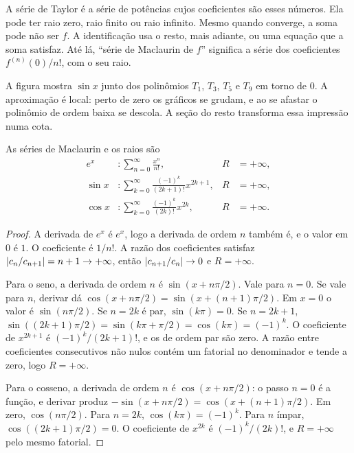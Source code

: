 \documentclass[11pt,a4paper]{article}
\begin{document}
A série de Taylor é a série de potências cujos coeficientes são esses números. Ela pode ter raio zero, raio finito ou raio infinito. Mesmo quando converge, a soma pode não ser \(f\). A identificação usa o resto, mais adiante, ou uma equação que a soma satisfaz. Até lá, ``série de Maclaurin de \(f\)'' significa a série dos coeficientes \(f^{(n)}(0)/n!\), com o seu raio.


A figura mostra \(\sin x\) junto dos polinômios \(T_1\), \(T_3\), \(T_5\) e \(T_9\) em torno de \(0\). A aproximação é local: perto de zero os gráficos se grudam, e ao se afastar o polinômio de ordem baixa se descola. A seção do resto transforma essa impressão numa cota.

\begin{teorema}
As séries de Maclaurin e os raios são
\begin{align*}
e^x&\colon\sum_{n=0}^\infty\frac{x^n}{n!},& R&=+\infty,\\
\sin x&\colon\sum_{k=0}^\infty\frac{(-1)^k}{(2k+1)!}x^{2k+1},& R&=+\infty,\\
\cos x&\colon\sum_{k=0}^\infty\frac{(-1)^k}{(2k)!}x^{2k},& R&=+\infty.
\end{align*}
\end{teorema}

\begin{proof}
A derivada de \(e^x\) é \(e^x\), logo a derivada de ordem \(n\) também é, e o valor em \(0\) é \(1\). O coeficiente é \(1/n!\). A razão dos coeficientes satisfaz \(\left\lvert c_n/c_{n+1} \right\rvert=n+1\to+\infty\), então \(\left\lvert c_{n+1}/c_n \right\rvert\to 0\) e \(R=+\infty\).

Para o seno, a derivada de ordem \(n\) é \(\sin(x+n\pi/2)\). Vale para \(n=0\). Se vale para \(n\), derivar dá \(\cos(x+n\pi/2)=\sin(x+(n+1)\pi/2)\). Em \(x=0\) o valor é \(\sin(n\pi/2)\). Se \(n=2k\) é par, \(\sin(k\pi)=0\). Se \(n=2k+1\), \(\sin((2k+1)\pi/2)=\sin(k\pi+\pi/2)=\cos(k\pi)=(-1)^k\). O coeficiente de \(x^{2k+1}\) é \((-1)^k/(2k+1)!\), e os de ordem par são zero. A razão entre coeficientes consecutivos não nulos contém um fatorial no denominador e tende a zero, logo \(R=+\infty\).

Para o cosseno, a derivada de ordem \(n\) é \(\cos(x+n\pi/2)\): o passo \(n=0\) é a função, e derivar produz \(-\sin(x+n\pi/2)=\cos(x+(n+1)\pi/2)\). Em zero, \(\cos(n\pi/2)\). Para \(n=2k\), \(\cos(k\pi)=(-1)^k\). Para \(n\) ímpar, \(\cos((2k+1)\pi/2)=0\). O coeficiente de \(x^{2k}\) é \((-1)^k/(2k)!\), e \(R=+\infty\) pelo mesmo fatorial.
\end{proof}
\end{document}
